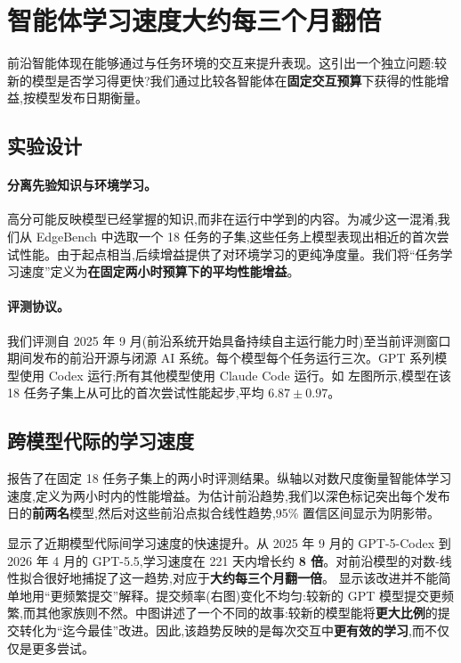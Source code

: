 \section{智能体学习速度大约每三个月翻倍}
\label{sec:speed}

前沿智能体现在能够通过与任务环境的交互来提升表现。这引出一个独立问题:较新的模型是否学习得更快?我们通过比较各智能体在\textbf{固定交互预算}下获得的性能增益,按模型发布日期衡量。

\subsection{实验设计}
\label{sec:speed-design}

\paragraph{分离先验知识与环境学习。} 高分可能反映模型已经掌握的知识,而非在运行中学到的内容。为减少这一混淆,我们从 EdgeBench 中选取一个 18 任务的子集,这些任务上模型表现出相近的首次尝试性能。由于起点相当,后续增益提供了对环境学习的更纯净度量。我们将``任务学习速度''定义为\textbf{在固定两小时预算下的平均性能增益}。

\paragraph{评测协议。} 我们评测自 2025 年 9 月(前沿系统开始具备持续自主运行能力时)至当前评测窗口期间发布的前沿开源与闭源 AI 系统。每个模型每个任务运行三次。GPT 系列模型使用 Codex 运行;所有其他模型使用 Claude Code 运行。如  左图所示,模型在该 18 任务子集上从可比的首次尝试性能起步,平均 $6.87 \pm 0.97$。

\subsection{跨模型代际的学习速度}

 报告了在固定 18 任务子集上的两小时评测结果。纵轴以对数尺度衡量智能体学习速度,定义为两小时内的性能增益。为估计前沿趋势,我们以深色标记突出每个发布日的\textbf{前两名}模型,然后对这些前沿点拟合线性趋势,95\% 置信区间显示为阴影带。

 显示了近期模型代际间学习速度的快速提升。从 2025 年 9 月的 GPT-5-Codex 到 2026 年 4 月的 GPT-5.5,学习速度在 221 天内增长约 \textbf{8 倍}。对前沿模型的对数-线性拟合很好地捕捉了这一趋势,对应于\textbf{大约每三个月翻一倍}。 显示该改进并不能简单地用``更频繁提交''解释。提交频率(右图)变化不均匀:较新的 GPT 模型提交更频繁,而其他家族则不然。中图讲述了一个不同的故事:较新的模型能将\textbf{更大比例}的提交转化为``迄今最佳''改进。因此,该趋势反映的是每次交互中\textbf{更有效的学习},而不仅仅是更多尝试。

